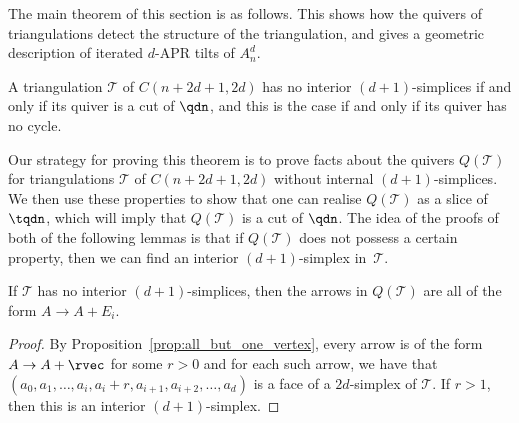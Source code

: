 The main theorem of this section is as follows. This shows how the quivers of triangulations detect the structure of the triangulation, and gives a geometric description of iterated $d$-APR tilts of $A_{n}^{d}$.

\begin{theorem}\label{thm:interior}
A triangulation $\mathcal{T}$ of $C(n + 2d + 1, 2d)$ has no interior $(d+1)$-simplices if and only if its quiver is a cut of $\qdn$, and this is the case if and only if its quiver has no cycle.
\end{theorem}

Our strategy for proving this theorem is to prove facts about the quivers $Q(\mathcal{T})$ for triangulations $\mathcal{T}$ of $C(n + 2d + 1, 2d)$ without internal $(d + 1)$-simplices. We then use these properties to show that one can realise $Q(\mathcal{T})$ as a slice of $\tqdn$, which will imply that $Q(\mathcal{T})$ is a cut of $\qdn$. The idea of the proofs of both of the following lemmas is that if $Q(\mathcal{T})$ does not possess a certain property, then we can find an interior $(d + 1)$-simplex in~$\mathcal{T}$.

\begin{lemma}\label{lem:single-step-arrows}
If $\mathcal{T}$ has no interior $(d+1)$-simplices, then the arrows in $Q(\mathcal{T})$ are all of the form $A \rightarrow A + E_{i}$.
\end{lemma}
\begin{proof}
By Proposition~\ref{prop:all_but_one_vertex}, every arrow is of the form $A \rightarrow A + \rvec$ for some $r>0$ and for each such arrow, we have that $(a_{0}, a_{1}, \dots, a_{i}, a_{i} + r, a_{i+1}, a_{i + 2}, \dots, a_{d})$ is a face of a $2d$-simplex of $\mathcal{T}$. If $r>1$, then this is an interior $(d+1)$-simplex.
\end{proof}

